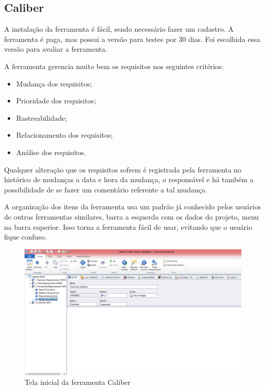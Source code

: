 \subsection{Caliber}
A instalação da ferramenta é fácil, sendo necessário fazer um cadastro. A ferramenta é paga, mas possui a versão para testes por 30 dias.
Foi escolhida essa versão para avaliar a ferramenta.

A ferramenta gerencia muito bem os requisitos nos seguintes critérios:
\begin{itemize}
  \item Mudança dos requisitos;
  \item Prioridade dos requisitos;
  \item Rastreabilidade;
  \item Relacionamento dos requisitos;
  \item Análise dos requisitos.
\end{itemize}

Qualquer alteração que os requisitos sofrem é registrada pela ferramenta no histórico de mudanças a data e hora da mudança, o responsável e há
também a possibilidade de se fazer um comentário referente a tal mudança.

A organização dos itens da ferramenta usa um padrão já conhecido pelos usuários de outras ferramentas similares, barra a esquerda com os dados do projeto,
menu na barra superior. Isso torna a ferramenta fácil de usar, evitando que o usuário fique confuso.

\begin{figure}[!htb]
\centering
\includegraphics[scale=0.4]{figuras/caliber.png}
\caption{Tela inicial da ferramenta Caliber}
\end{figure}
